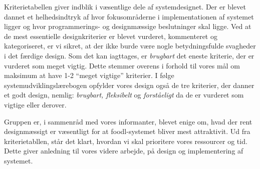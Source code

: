 Kriterietabellen giver indblik i væsentlige dele af systemdesignet. Der er blevet dannet et helhedsindtryk af hvor fokusområderne i implementationen af systemet ligger og hvor programmerings- og designmæssige beslutninger skal ligge. Ved at de mest essentielle designkriterier er blevet vurderet, kommenteret og kategoriseret, er vi sikret, at der ikke burde være nogle betydningsfulde svagheder i det færdige design. Som det kan iagttages, er \emph{brugbart} det eneste kriterie, der er vurderet som meget vigtig. Dette stemmer overens i forhold til vores mål om maksimum at have 1-2 ``meget vigtige'' kriterier. I følge systemudviklingslærebogen \cite{ooad} opfylder vores design også de tre kriterier, der danner et godt design, nemlig: \emph{brugbart, fleksibelt} og \emph{forståeligt} da de er vurderet som vigtige eller derover.

Gruppen er, i sammenråd med vores informanter, blevet enige om, hvad der rent designmæssigt er væsentligt for at foodl-systemet bliver mest attraktivit. Ud fra kriterietabllen, står det klart, hvordan vi skal prioritere vores ressourcer og tid. Dette giver anledning til vores videre arbejde, på design og implementering af systemet.